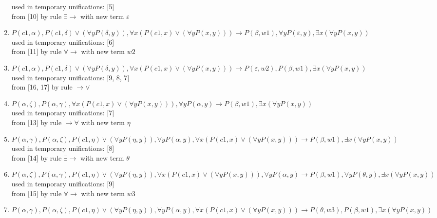 \begin{enumerate}
  used in temporary unifications: [5]\\
 from [10] by rule $\exists \rightarrow $ with new term $\varepsilon$
\item $P(c1, \alpha), P(c1, \delta)  \vee  ( \forall  y P(\delta, y)),  \forall  x (P(c1, x)  \vee  ( \forall  y P(x, y))) \rightarrow  P(\beta, w1),  \forall  y P(\varepsilon, y),  \exists  x ( \forall  y P(x, y))$\\
  used in temporary unifications: [6]\\
 from [11] by rule $\forall \rightarrow $ with new term $w2$
\item $P(c1, \alpha), P(c1, \delta)  \vee  ( \forall  y P(\delta, y)),  \forall  x (P(c1, x)  \vee  ( \forall  y P(x, y))) \rightarrow  P(\varepsilon, w2), P(\beta, w1),  \exists  x ( \forall  y P(x, y))$\\
  used in temporary unifications: [9, 8, 7]\\
 from [16, 17] by rule $\rightarrow  \vee $
\item $P(\alpha, \zeta), P(\alpha, \gamma),  \forall  x (P(c1, x)  \vee  ( \forall  y P(x, y))),  \forall  y P(\alpha, y) \rightarrow  P(\beta, w1),  \exists  x ( \forall  y P(x, y))$\\
  used in temporary unifications: [7]\\
 from [13] by rule $\rightarrow \forall $ with new term $\eta$
\item $P(\alpha, \gamma), P(\alpha, \zeta), P(c1, \eta)  \vee  ( \forall  y P(\eta, y)),  \forall  y P(\alpha, y),  \forall  x (P(c1, x)  \vee  ( \forall  y P(x, y))) \rightarrow  P(\beta, w1),  \exists  x ( \forall  y P(x, y))$\\
  used in temporary unifications: [8]\\
 from [14] by rule $\exists \rightarrow $ with new term $\theta$
\item $P(\alpha, \zeta), P(\alpha, \gamma), P(c1, \eta)  \vee  ( \forall  y P(\eta, y)),  \forall  x (P(c1, x)  \vee  ( \forall  y P(x, y))),  \forall  y P(\alpha, y) \rightarrow  P(\beta, w1),  \forall  y P(\theta, y),  \exists  x ( \forall  y P(x, y))$\\
  used in temporary unifications: [9]\\
 from [15] by rule $\forall \rightarrow $ with new term $w3$
\item $P(\alpha, \gamma), P(\alpha, \zeta), P(c1, \eta)  \vee  ( \forall  y P(\eta, y)),  \forall  y P(\alpha, y),  \forall  x (P(c1, x)  \vee  ( \forall  y P(x, y))) \rightarrow  P(\theta, w3), P(\beta, w1),  \exists  x ( \forall  y P(x, y))$\\

\end{enumerate}
